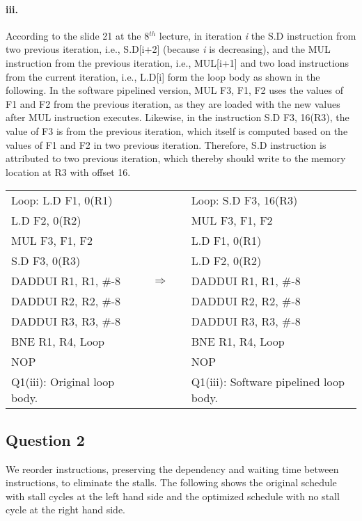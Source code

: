 \documentclass[11pt]{article}
\newcommand{\q}[1]{\subsection*{Question {#1}}}
\renewcommand{\part}[1]{\paragraph*{{#1}.}}
\newcommand{\code}[1]{\textsf{#1}}
\begin{document}
\part{iii} According to the slide 21 at the 8$^{th}$ lecture, in iteration \textit{i} the \code{S.D} instruction from two previous iteration, i.e., \code{S.D[i+2]} (because \textit{i} is decreasing), and the \code{MUL} instruction from the previous iteration, i.e., \code{MUL[i+1]} and two load instructions from the current iteration, i.e., \code{L.D[i]} form the loop body as shown in the following. In the software pipelined version, \code{MUL F3, F1, F2} uses the values of \code{F1} and \code{F2} from the previous iteration, as they are loaded with the new values after \code{MUL} instruction executes. Likewise, in the instruction \code{S.D F3, 16(R3)}, the value of \code{F3} is from the previous iteration, which itself is computed based on the values of \code{F1} and \code{F2} in two previous iteration. Therefore, \code{S.D} instruction is attributed to two previous iteration, which thereby should write to the memory location at \code{R3} with offset 16.

\begin{table}[h]
\center
\small
\begin{tabular}{lcccl}
	  \code{Loop:} \code{L.D F1, 0(R1)} & & & &  \code{Loop:} \code{S.D F3, 16(R3)} \\
	 \code{L.D F2, 0(R2)}  & & & & \code{MUL F3, F1, F2}\\
	 \code{MUL F3, F1, F2}  & & & & \code{L.D F1, 0(R1)} \\
	 \code{S.D F3, 0(R3)} & & & & \code{L.D F2, 0(R2)} \\
	 \code{DADDUI R1, R1, \#-8} & & $\Rightarrow$ & & \code{DADDUI R1, R1, \#-8} \\
	 \code{DADDUI R2, R2, \#-8} & & & & \code{DADDUI R2, R2, \#-8} \\
	 \code{DADDUI R3, R3, \#-8} & & & & \code{DADDUI R3, R3, \#-8} \\
	 \code{BNE R1, R4, Loop} & & & & \code{BNE R1, R4, Loop} \\ 
	 \code{NOP} & & & & \code{NOP} \\
	 Q1(iii): Original loop body. & & & & Q1(iii): Software pipelined loop body.
\end{tabular}
\label{tbl:q1p3}
\end{table}

\q{2} We reorder instructions, preserving the dependency and waiting time between instructions, to eliminate the stalls. The following shows the original schedule with stall cycles at the left hand side and the optimized schedule with no stall cycle at the right hand side. 
\end{document}
